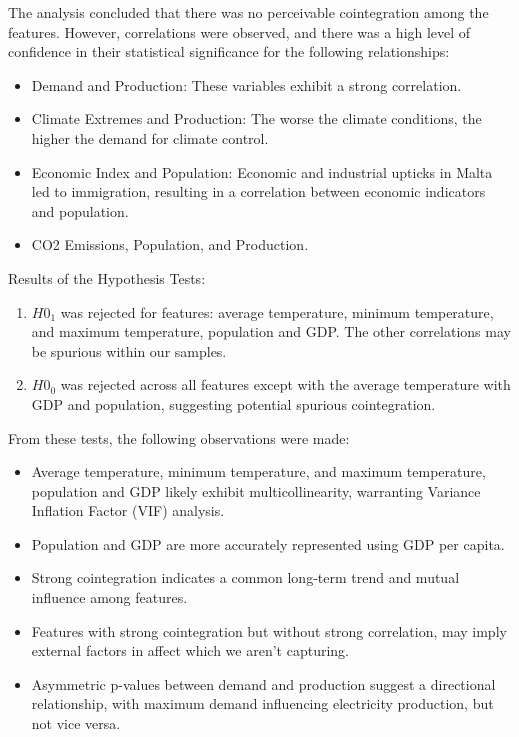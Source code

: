 \documentclass{ieeeaccess}
\begin{document}
The analysis concluded that there was no perceivable cointegration among the features. However, correlations were observed, and there was a high level of confidence in their statistical significance for the following relationships:
\begin{itemize}
    \item Demand and Production: These variables exhibit a strong correlation.
    \item Climate Extremes and Production: The worse the climate conditions, the higher the demand for climate control.
    \item Economic Index and Population: Economic and industrial upticks in Malta led to immigration, resulting in a correlation between economic indicators and population.
    \item CO2 Emissions, Population, and Production.
\end{itemize}

Results of the Hypothesis Tests:
\begin{enumerate}
    \item \(H0_1\) was rejected for features: average temperature, minimum temperature, and maximum temperature, population and GDP. The other correlations may be spurious within our samples.
    \item \(H0_0\) was rejected across all features except with the average temperature with GDP and population, suggesting potential spurious cointegration.
\end{enumerate}

From these tests, the following observations were made:
\begin{itemize}
    \item Average temperature, minimum temperature, and maximum temperature, population and GDP likely exhibit multicollinearity, warranting Variance Inflation Factor (VIF) analysis.
    \item Population and GDP are more accurately represented using GDP per capita.
    \item Strong cointegration indicates a common long-term trend and mutual influence among features.
    \item Features with strong cointegration but without strong correlation, may imply external factors in affect which we aren't capturing.
    \item Asymmetric p-values between demand and production suggest a directional relationship, with maximum demand influencing electricity production, but not vice versa.
\end{itemize}
\end{document}
